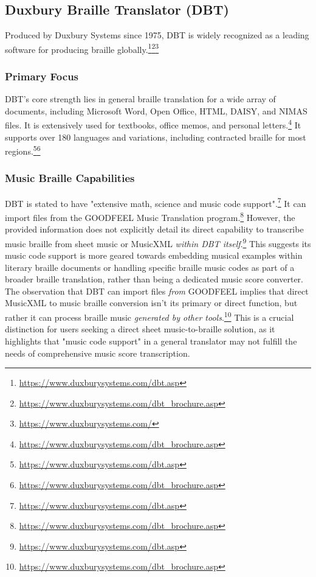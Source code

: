 \subsection{Duxbury Braille Translator (DBT)}
Produced by Duxbury Systems since 1975, DBT is widely recognized as a leading software for producing braille globally.\footnote{\url{https://www.duxburysystems.com/dbt.asp}}\footnote{\url{https://www.duxburysystems.com/dbt_brochure.asp}}\footnote{\url{https://www.duxburysystems.com/}}

\subsubsection{Primary Focus}
DBT's core strength lies in general braille translation for a wide array of documents, including Microsoft Word, Open Office, HTML, DAISY, and NIMAS files. It is extensively used for textbooks, office memos, and personal letters.\footnote{\url{https://www.duxburysystems.com/dbt_brochure.asp}} It supports over 180 languages and variations, including contracted braille for most regions.\footnote{\url{https://www.duxburysystems.com/dbt.asp}}\footnote{\url{https://www.duxburysystems.com/dbt_brochure.asp}}

\subsubsection{Music Braille Capabilities}
DBT is stated to have "extensive math, science and music code support".\footnote{\url{https://www.duxburysystems.com/dbt.asp}} It can import files from the GOODFEEL Music Translation program.\footnote{\url{https://www.duxburysystems.com/dbt_brochure.asp}} However, the provided information does not explicitly detail its direct capability to transcribe music braille from sheet music or MusicXML \textit{within DBT itself}.\footnote{\url{https://www.duxburysystems.com/dbt.asp}} This suggests its music code support is more geared towards embedding musical examples within literary braille documents or handling specific braille music codes as part of a broader braille translation, rather than being a dedicated music score converter. The observation that DBT can import files \textit{from} GOODFEEL implies that direct MusicXML to music braille conversion isn't its primary or direct function, but rather it can process braille music \textit{generated by other tools}.\footnote{\url{https://www.duxburysystems.com/dbt_brochure.asp}} This is a crucial distinction for users seeking a direct sheet music-to-braille solution, as it highlights that "music code support" in a general translator may not fulfill the needs of comprehensive music score transcription.


